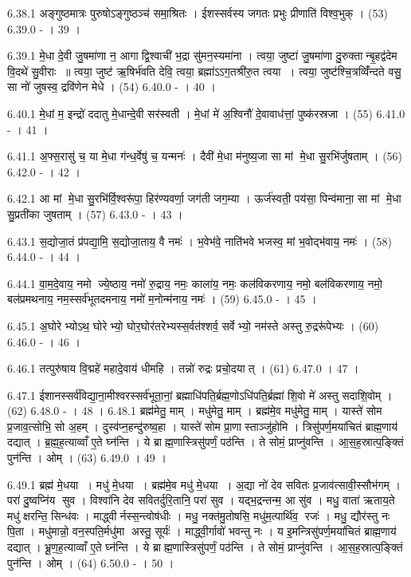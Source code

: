 6.38.1
अङ्गुष्ठमात्रः पुरुषोऽङ्गुष्ठञ्च॑ समा॒श्रितः । ईशस्सर्वस्य जगतः प्रभुः प्रीणाति॑ विश्व॒भुक् । (53)
6.39.0
- । 39 ।
\anuvakamend

6.39.1
मे॒धा दे॒वी जु॒षमा॑णा न॒ आगाद्वि॒श्वाची॑ भ॒द्रा सु॑मन॒स्यमा॑ना । त्वया॒ जुष्टा॑ जु॒षमा॑णा दु॒रुक्तान्बृ॒हद्व॑देम वि॒दथे॑ सु॒वीराः ॥ त्वया॒ जुष्ट॑ ऋ॒षिर्भ॑वति देवि॒ त्वया॒ ब्रह्मा॑ऽऽग॒तश्री॑रु॒त त्वया । त्वया॒ जुष्ट॑श्चि॒त्रव्विँ॑न्दते वसु॒ सा नो॑ जुषस्व॒ द्रवि॑णेन मेधे । (54)
6.40.0
- । 40 ।
\anuvakamend

6.40.1
मे॒धां म॒ इन्द्रो॑ ददातु मे॒धान्दे॒वी सर॑स्वती । मे॒धां मे॑ अ॒श्विनौ॑ दे॒वावाध॑त्तां॒ पुष्क॑रस्रजा । (55)
6.41.0
- । 41 ।
\anuvakamend

6.41.1
अ॒फ्स॒रासु॑ च॒ या मे॒धा ग॑न्ध॒र्वेषु॑ च॒ यन्मनः॑ । दैवी॑ मे॒धा म॑नुष्य॒जा सा मां मे॒धा सु॒रभि॑र्जुषताम् । (56)
6.42.0
- । 42 ।
\anuvakamend

6.42.1
आ मां मे॒धा सु॒रभि॑र्वि॒श्वरू॑पा॒ हिर॑ण्यवर्णा॒ जग॑ती जग॒म्या । ऊर्ज॑स्वती॒ पय॑सा॒ पिन्व॑माना॒ सा मां मे॒धा सु॒प्रती॑का जुषताम् । (57)
6.43.0
- । 43 ।
\anuvakamend

6.43.1
स॒द्योजा॒तं प्र॑पद्या॒मि॒ स॒द्योजा॒ताय॒ वै नमः॑ । भ॒वेभ॑वे॒ नाति॑भवे भजस्व॒ मां भ॒वोद्भ॑वाय॒ नमः॑ । (58)
6.44.0
- । 44 ।
\anuvakamend

6.44.1
वा॒म॒दे॒वाय॒ नमो ज्ये॒ष्ठाय॒ नमो॑ रु॒द्राय॒ नमः॒ काला॑य॒ नमः॒ कल॑विकरणाय॒ नमो॒ बल॑विकरणाय॒ नमो॒ बल॑प्रमथनाय॒ नम॒स्सर्व॑भूतदमनाय॒ नमो॑ म॒नोन्म॑नाय॒ नमः॑ । (59)
6.45.0
- । 45 ।
\anuvakamend

6.45.1
अ॒घोरेभ्योऽथ॒ घोरेभ्यो॒ घोर॒घोर॑तरेभ्यस्स॒र्वत॑श्शर्व॒ सर्वेभ्यो॒ नम॑स्ते अस्तु रु॒द्ररू॑पेभ्यः । (60)
6.46.0
- । 46 ।
\anuvakamend

6.46.1
तत्पुरु॑षाय वि॒द्महे॑ महादे॒वाय॑ धीमहि । तन्नो॑ रुद्रः प्रचो॒दयात् । (61)
6.47.0
। 47 ।
\anuvakamend

6.47.1
ईशानस्सर्व॑विद्या॒ना॒मीश्वरस्सर्व॑भूता॒नां॒ ब्रह्माधि॑पति॒र्ब्रह्म॒णोऽधि॑पति॒र्ब्रह्मा॑ शि॒वो मे॑ अस्तु सदाशि॒वोम् । (62)
6.48.0
- । 48 ।
6.48.1
ब्रह्म॑मेतु॒ माम् । मधु॑मेतु॒ माम् । ब्रह्म॑मे॒व मधु॑मेतु॒ माम् । यास्ते॑ सोम प्र॒जाव॒त्सोभि॒ सो अ॒हम् । दुस्व॑प्न॒हन्दु॑रुष्व॒हा । यास्ते॑ सोम प्रा॒णास्ताञ्जु॑होमि । त्रिसु॑पर्ण॒मया॑चितं ब्राह्म॒णाय॑ दद्यात् । ब्र॒ह्म॒ह॒त्याव्वाँ ए॒ते घ्न॑न्ति । ये ब्राह्म॒णास्त्रिसु॑पर्णं॒ पठ॑न्ति । ते सोमं॒ प्राप्नु॑वन्ति । आ॒स॒ह॒स्रात्प॒ङ्क्तिं पुन॑न्ति । ओम् । (63)
6.49.0
। 49 ।
\anuvakamend

6.49.1
ब्रह्म॑ मे॒धया । मधु॑ मे॒धया । ब्रह्म॑मे॒व मधु॑ मे॒धया । अ॒द्या नो॑ देव सवितः प्र॒जाव॑त्सावी॒स्सौभ॑गम् । परा॑ दु॒ष्वप्नि॑य सुव । विश्वा॑नि देव सवितर्दुरि॒तानि॒ परा॑ सुव । यद्भ॒द्रन्तन्म॒ आ सु॑व । मधु॒ वाता॑ ऋताय॒ते मधु॑ क्षरन्ति॒ सिन्ध॑वः । माद्ध्वीर्नस्स॒न्त्वोष॑धीः । मधु॒ नक्त॑मु॒तोषसि॒ मधु॑म॒त्पार्थि॑व॒ रजः॑ । मधु॒ द्यौर॑स्तु नः पि॒ता । मधु॑मान्नो॒ वन॒स्पति॒र्मधु॑मा अस्तु॒ सूर्यः॑ । माद्ध्वी॒र्गावो॑ भवन्तु नः । य इ॒मन्त्रिसु॑पर्ण॒मया॑चितं ब्राह्म॒णाय॑ दद्यात् । भ्रू॒ण॒ह॒त्याव्वाँ ए॒ते घ्न॑न्ति । ये ब्राह्म॒णास्त्रिसु॑पर्णं॒ पठ॑न्ति । ते सोमं॒ प्राप्नु॑वन्ति । आ॒स॒ह॒स्रात्प॒ङ्क्तिं पुन॑न्ति । ओम् । (64)
6.50.0
- । 50 ।
\anuvakamend

